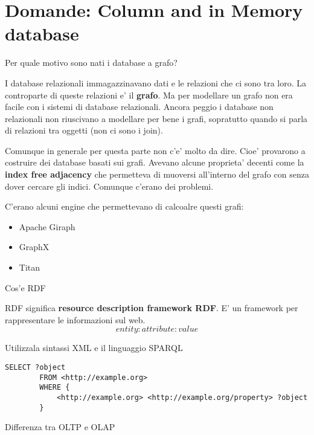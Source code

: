 \section{Domande: Column and in Memory database}

\begin{domanda}
    Per quale motivo sono nati i database a grafo?
\end{domanda}

I database relazionali immagazzinavano dati e le relazioni che ci sono tra
loro. La controparte di queste relazioni e' il \textbf{grafo}. Ma per modellare
un grafo non era facile con i sistemi di database relazionali. Ancora peggio i
database non relazionali non riuscivano a modellare per bene i grafi,
sopratutto quando si parla di relazioni tra oggetti (non ci sono i join).

Comunque in generale per questa parte non c'e' molto da dire. Cioe' provarono a
costruire dei database basati sui grafi. Avevano alcune proprieta' decenti come
la \textbf{index free adjacency} che permetteva di muoversi all'interno del
grafo con senza dover cercare gli indici. Comunque c'erano dei problemi.

C'erano alcuni engine che permettevano di calcoalre questi grafi:
\begin{itemize}
    \item Apache Giraph
    \item GraphX
    \item Titan
\end{itemize}

\begin{domanda}
    Cos'e RDF
\end{domanda}

RDF significa \textbf{resource description framework RDF}. E' un framework per
rappresentare le informazioni sul web.
\begin{equation}
    entity:attribute:value
\end{equation}

Utilizzala sintassi XML e il linguaggio SPARQL
\begin{lstlisting}[language=SPARQL, caption={Esempio di query SPARQL}]
    SELECT ?object
        FROM <http://example.org>
        WHERE {
            <http://example.org> <http://example.org/property> ?object
        }
\end{lstlisting}

\begin{domanda}
    Differenza tra OLTP e OLAP
\end{domanda}

